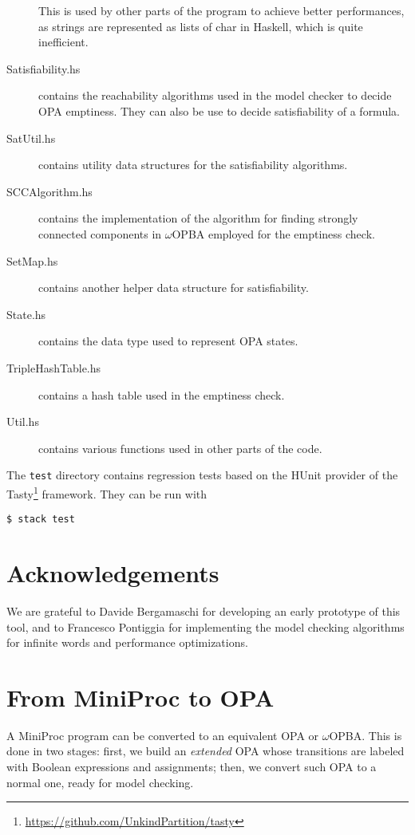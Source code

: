 \documentclass[9pt,a4paper]{article}
\begin{document}
\begin{description}
  This is used by other parts of the program to achieve better performances,
  as strings are represented as lists of char in Haskell, which is quite
  inefficient.
\item[Satisfiability.hs] contains the reachability algorithms used in the
  model checker to decide OPA emptiness. They can also be use to decide
  satisfiability of a formula.
\item[SatUtil.hs] contains utility data structures for the satisfiability algorithms.
\item[SCCAlgorithm.hs] contains the implementation of the algorithm for finding strongly
  connected components in $\omega$OPBA employed for the emptiness check.
\item[SetMap.hs] contains another helper data structure for satisfiability.
\item[State.hs] contains the data type used to represent OPA states.
\item[TripleHashTable.hs] contains a hash table used in the emptiness check.
\item[Util.hs] contains various functions used in other parts of the code.
\end{description}

The \texttt{test} directory contains regression tests based on the HUnit
provider of the Tasty\footnote{\url{https://github.com/UnkindPartition/tasty}} framework.
They can be run with
\begin{verbatim}
$ stack test
\end{verbatim}


\section*{Acknowledgements}

We are grateful to Davide Bergamaschi for developing an early prototype of this tool,
and to Francesco Pontiggia for implementing the model checking algorithms
for infinite words and performance optimizations.





\appendix

\section{From MiniProc to OPA}
\label{sec:miniproc-to-opa}

A MiniProc program can be converted to an equivalent OPA or $\omega$OPBA.
This is done in two stages: first, we build an \emph{extended} OPA whose transitions are labeled with Boolean expressions and assignments; then, we convert such OPA to a normal one, ready for model checking.
\end{document}
